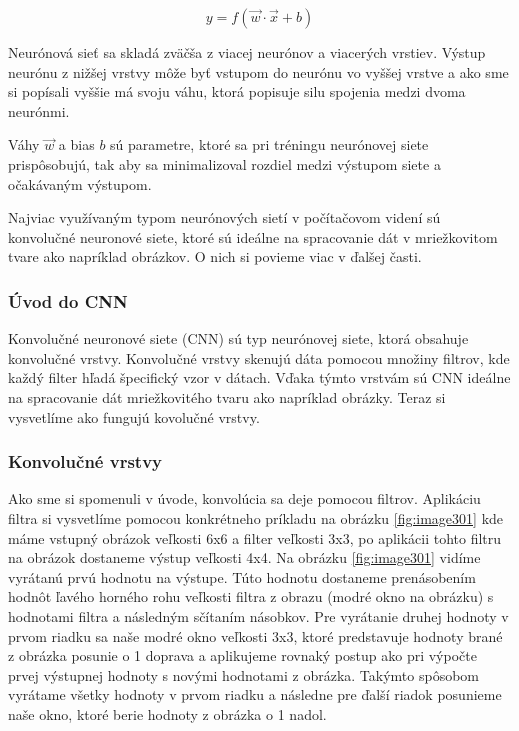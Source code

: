 \begin{equation}
y = f(\vec{w} \cdot \vec{x} + b) \label{eq:perceptron}
\end{equation}

Neurónová sieť sa skladá zväčša z viacej neurónov a viacerých vrstiev. Výstup neurónu z nižšej vrstvy môže byť vstupom do neurónu vo vyššej vrstve a ako sme si popísali vyššie má svoju váhu, ktorá popisuje silu spojenia medzi dvoma neurónmi.

Váhy $\vec{w}$ a bias $b$ sú parametre, ktoré sa pri tréningu neurónovej siete prispôsobujú, tak aby sa minimalizoval rozdiel medzi výstupom siete a očakávaným výstupom.

Najviac využívaným typom neurónových sietí v počítačovom videní sú konvolučné neuronové siete, ktoré sú ideálne na spracovanie dát v mriežkovitom tvare ako napríklad obrázkov. O nich si povieme viac v ďalšej časti.

\subsubsection{Úvod do CNN}
\hspace{\parindent} Konvolučné neuronové siete (CNN) \cite{CNN} sú typ neurónovej siete, ktorá obsahuje konvolučné vrstvy. Konvolučné vrstvy skenujú dáta pomocou množiny filtrov, kde každý filter hľadá špecifický vzor v dátach. Vďaka týmto vrstvám sú CNN ideálne na spracovanie dát mriežkovitého tvaru ako napríklad obrázky. Teraz si vysvetlíme ako fungujú kovolučné vrstvy.

\subsubsection{Konvolučné vrstvy}
\hspace{\parindent} 
Ako sme si spomenuli v úvode, konvolúcia sa deje pomocou filtrov. Aplikáciu filtra si vysvetlíme pomocou konkrétneho príkladu na obrázku \ref{fig:image301} kde máme vstupný obrázok veľkosti 6x6 a filter veľkosti 3x3, po aplikácii tohto filtru na obrázok dostaneme výstup veľkosti 4x4. Na obrázku \ref{fig:image301} vidíme vyrátanú prvú hodnotu na výstupe. Túto hodnotu dostaneme prenásobením hodnôt ľavého horného rohu veľkosti filtra z obrazu (modré okno na obrázku) s hodnotami filtra a následným sčítaním násobkov. Pre vyrátanie druhej hodnoty v prvom riadku sa naše modré okno veľkosti 3x3, ktoré predstavuje hodnoty brané z obrázka posunie o 1 doprava a aplikujeme rovnaký postup ako pri výpočte prvej výstupnej hodnoty s novými hodnotami z obrázka. Takýmto spôsobom vyrátame všetky hodnoty v prvom riadku a následne pre ďalší riadok posunieme naše okno, ktoré berie hodnoty z obrázka o 1 nadol. 

